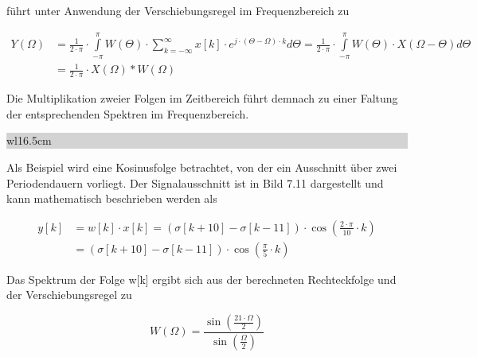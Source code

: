 \noindent f\"{u}hrt unter Anwendung der Verschiebungsregel im Frequenzbereich zu

\begin{equation}\label{eq:sevenseightyone}
\begin{split}
Y\left(\Omega \right) &=\frac{1}{2\cdot \pi} \cdot \int\limits _{-\pi}^{\pi}W\left(\Theta \right)\cdot \sum _{k=-\infty }^{\infty }x\left[k\right]\cdot e^{j\cdot \left(\Theta -\Omega \right)\cdot k}d\Theta  =\frac{1}{2\cdot \pi } \cdot \int\limits _{-\pi}^{\pi}W\left(\Theta \right)\cdot X\left(\Omega -\Theta \right)d\Theta \\
&=\frac{1}{2\cdot \pi} \cdot X(\Omega)*W(\Omega)
\end{split}
\end{equation}

\noindent Die Multiplikation zweier Folgen im Zeitbereich f\"{u}hrt demnach zu einer Faltung der entsprechenden Spektren im Frequenzbereich.\bigskip

\noindent
\colorbox{lightgray}{%
%
\renewcommand\arraystretch{0.6}%
\begin{tabular}{ wl{16.5cm} }
{\selectfont{Beispiel: Fensterung als Multiplikation im Zeitbereich}}
\end{tabular}%
}\medskip

\noindent Als Beispiel wird eine Kosinusfolge betrachtet, von der ein Ausschnitt \"{u}ber zwei Periodendauern vorliegt. Der Signalausschnitt ist in Bild 7.11 dargestellt und kann mathematisch beschrieben werden als 

\begin{equation}\label{eq:sevenseightytwo}
\begin{split}
y\left[k\right] &=w\left[k\right]\cdot x\left[k\right]=\left(\sigma \left[k+10\right]-\sigma \left[k-11\right]\right)\cdot \cos \left(\frac{2\cdot \pi }{10} \cdot k\right) \\ 
&=\left(\sigma \left[k+10\right]-\sigma \left[k-11\right]\right)\cdot \cos \left(\frac{\pi }{5} \cdot k\right)
\end{split}
\end{equation}

\noindent Das Spektrum der Folge w[k] ergibt sich aus der berechneten Rechteckfolge und der Verschiebungsregel zu

\begin{equation}\label{eq:sevenseightythree}
W\left(\Omega \right)=\frac{\sin \left(\frac{21\cdot \Omega }{2} \right)}{\sin \left(\frac{\Omega }{2} \right)}
\end{equation}

